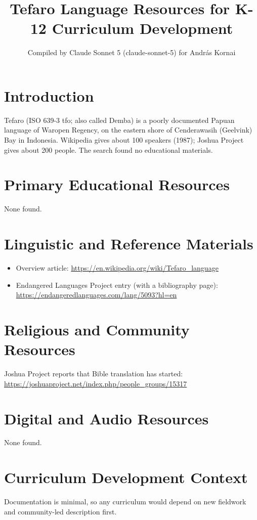 \documentclass[12pt]{article}
\title{Tefaro Language Resources for K-12 Curriculum Development}
\author{Compiled by Claude Sonnet 5 (claude-sonnet-5) for Andr\'as Kornai}
\date{}
\begin{document}
\maketitle
\section{Introduction}
Tefaro (ISO 639-3 tfo; also called Demba) is a poorly documented Papuan language of Waropen Regency, on the eastern shore of Cenderawasih (Geelvink) Bay in Indonesia. Wikipedia gives about 100 speakers (1987); Joshua Project gives about 200 people. The search found no educational materials.
\section{Primary Educational Resources}
None found.
\section{Linguistic and Reference Materials}
\begin{itemize}
\item Overview article: \url{https://en.wikipedia.org/wiki/Tefaro_language}
\item Endangered Languages Project entry (with a bibliography page): \url{https://endangeredlanguages.com/lang/5093?hl=en}
\end{itemize}
\section{Religious and Community Resources}
Joshua Project reports that Bible translation has started: \url{https://joshuaproject.net/index.php/people_groups/15317}
\section{Digital and Audio Resources}
None found.
\section{Curriculum Development Context}
Documentation is minimal, so any curriculum would depend on new fieldwork and community-led description first.
\end{document}
